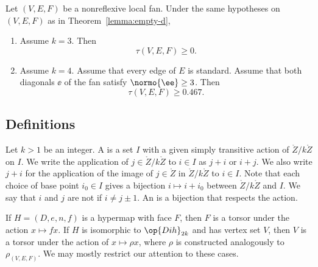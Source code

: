 \begin{lemma}\label{lemma:tau3}
Let $(V,E,F)$ be a nonreflexive local fan.
Under the same hypotheses on $(V,E,F)$ as in Theorem~\ref{lemma:empty-d}, 
\begin{enumerate}
\item Assume $k=3$. Then
\[\tau(V,E,F)\ge 0.\]
\item Assume $k=4$.  Assume that every edge of $E$ is standard.
Assume that both diagonals $\ee$ of the fan satisfy $\normo{\ee}\ge3$.
Then
\[
\tau(V,E,F)\ge 0.467.
\]
\end{enumerate}
\end{lemma}


\subsection{Definitions}


\begin{definition}
  Let $k>1$ be an integer.  A  is a set $I$ with a
  given simply transitive action of $\ring{Z}/k\ring{Z}$ on $I$.  We
  write the application of $j\in\ring{Z}/k\ring{Z}$ to $i\in I$ as
  $j+i$ or $i+j$.  We also write $j+i$
  for the application of the image of $j\in\ring{Z}$ in $\ring{Z}/k\ring{Z}$ to
  $i\in I$.  Note that each choice of base point $i_0\in I$ gives a
  bijection $i\mapsto i+i_0$ between $\ring{Z}/k\ring{Z}$ and $I$.  
  We say that $i$ and $j$ are not  if $i\ne j\pm 1$.
  An
 is a bijection that respects the action.
%
\end{definition}

\begin{example} If $H=(D,e,n,f)$ is a hypermap with face $F$,
then $F$ is a torsor under the action $x \mapsto f x$.  If $H$ is
isomorphic to $\op{Dih}_{2k}$ and has vertex set $V$, then $V$ is a torsor
under the action of $x\mapsto \rho x$, where $\rho$ is constructed
analogously to $\rho_{(V,E,F)}$.  We may mostly restrict our attention to
these cases.
\end{example}


